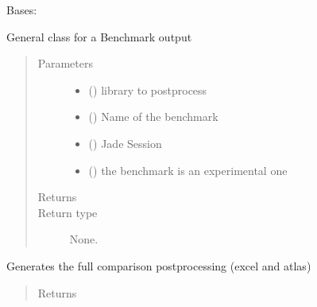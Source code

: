 \documentclass[letterpaper,10pt,english]{sphinxmanual}
\begin{document}
\begin{fulllineitems}
\label{\detokenize{api/postprocessing:output.BenchmarkOutput}}
Bases: {\hyperref[\detokenize{api/postprocessing:output.AbstractOutput}]{}}

General class for a Benchmark output
\begin{quote}\begin{description}
\item[{Parameters}] \leavevmode\begin{itemize}
\item {} 
 () \textendash{} library to post\sphinxhyphen{}process

\item {} 
 () \textendash{} Name of the benchmark

\item {} 
 ({\hyperref[\detokenize{api/initobjects:main.Session}]{}}) \textendash{} Jade Session

\item {} 
 () \textendash{} the benchmark is an experimental one

\end{itemize}

\item[{Returns}] \leavevmode


\item[{Return type}] \leavevmode
None.

\end{description}\end{quote}

\begin{fulllineitems}
\label{\detokenize{api/postprocessing:output.BenchmarkOutput.compare}}
Generates the full comparison post\sphinxhyphen{}processing (excel and atlas)
\begin{quote}\begin{description}
\item[{Returns}] \leavevmode



\end{description}
\end{quote}
\end{fulllineitems}
\end{fulllineitems}
\end{document}
